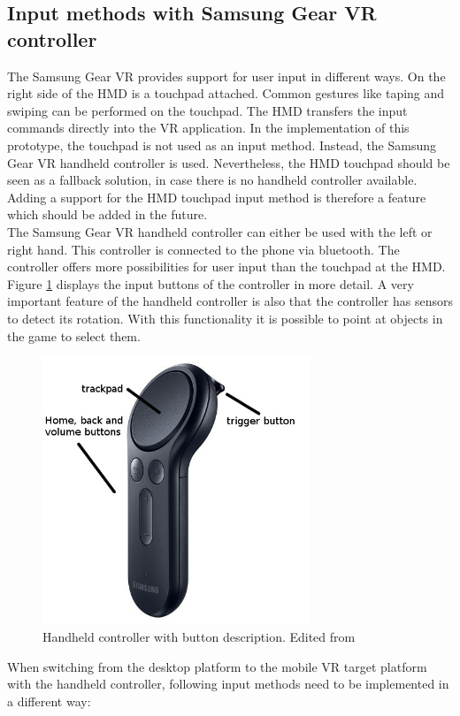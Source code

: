 \subsection{Input methods with Samsung Gear VR controller} \label{inputmethods}
The Samsung Gear VR provides support for user input in different ways. On the right side of the HMD is a touchpad attached. Common gestures like taping and swiping can be performed on the touchpad. The HMD transfers the input commands directly into the VR application. In the implementation of this prototype, the touchpad is not used as an input method. Instead, the Samsung Gear VR handheld controller is used. Nevertheless, the HMD touchpad should be seen as a fallback solution, in case there is no handheld controller available. Adding a support for the HMD touchpad input method is therefore a feature which should be added in the future.\\
The Samsung Gear VR handheld controller can either be used with the left or right hand. This controller is connected to the phone via bluetooth. The controller offers more possibilities for user input than the touchpad at the HMD. Figure \ref{fig:controller} displays the input buttons of the controller in more detail.
A very important feature of the handheld controller is also that the controller has sensors to detect its rotation. With this functionality it is possible to point at objects in the game to select them.\\
\begin{figure}[h!]
  \includegraphics[width=8cm]{kapitel/samsung-controller.jpg}
  \centering
  \caption{Handheld controller with button description. Edited from \cite{Samsung.2019b}}
  \label{fig:controller}
\end{figure}
When switching from the desktop platform to the mobile VR target platform with the handheld controller, following input methods need to be implemented in a different way:
